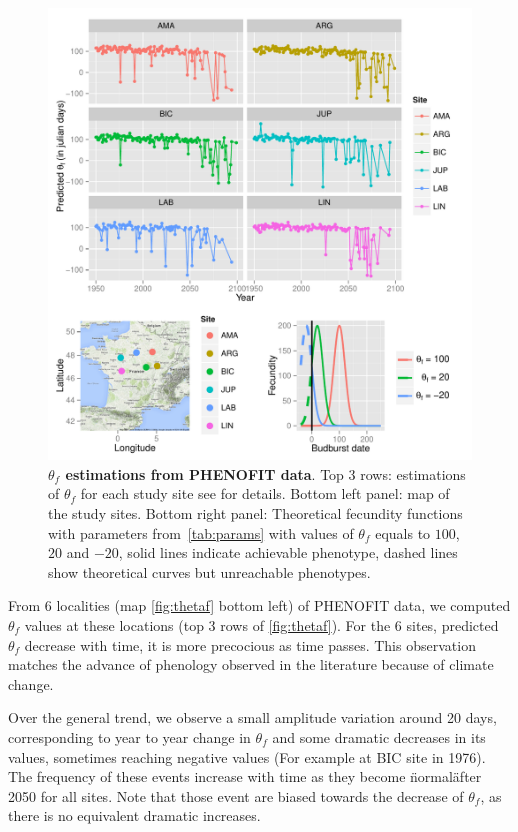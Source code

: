 \begin{figure}[ht!]
	\centering
	\includegraphics[scale=1]{Figures/optsmaps.pdf}
	\caption{\textbf{$\theta_{f}$ estimations from PHENOFIT data}. Top 3 rows: estimations of $\theta_f$ for each study site see  for details. Bottom left panel: map of the study sites. Bottom right panel: Theoretical fecundity functions with parameters from~\autoref{tab:params} with values of $\theta_f$ equals to $100$, $20$ and $-20$, solid lines indicate achievable phenotype, dashed lines show theoretical curves but unreachable phenotypes.}
	\label{fig:thetaf}
\end{figure}

From 6 localities (map \autoref{fig:thetaf} bottom left) of \textsc{PHENOFIT} data, we computed $\theta_f$ values at these locations (top 3 rows of \autoref{fig:thetaf}). For the 6 sites, predicted $\theta_f$ decrease with time, it is more precocious as time passes. This observation matches the advance of phenology observed in the literature because of climate change.

Over the general trend, we observe a small amplitude variation around 20 days, corresponding to year to year change in $\theta_f$ and some dramatic decreases in its values, sometimes reaching negative values (For example at BIC site in 1976). The frequency of these events increase with time as they become \"normal\" after 2050 for all sites. Note that those event are biased towards the decrease of $\theta_f$, as there is no equivalent dramatic increases.

